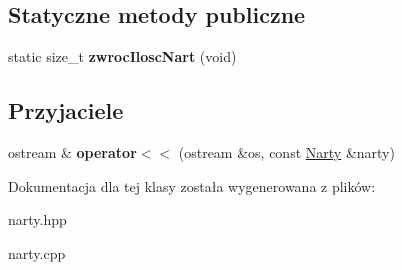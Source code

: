 \subsection*{Statyczne metody publiczne}
\begin{DoxyCompactItemize}
\item 
\mbox{\label{class_narty_a2f7178d88af8a1939ffa0c546b3ac4ee}} 
static size\+\_\+t {\bfseries zwroc\+Ilosc\+Nart} (void)
\end{DoxyCompactItemize}
\subsection*{Przyjaciele}
\begin{DoxyCompactItemize}
\item 
\mbox{\label{class_narty_af8090f0e17f1b341d4ef1e4c55391edf}} 
ostream \& {\bfseries operator$<$$<$} (ostream \&os, const \hyperlink{class_narty}{Narty} \&narty)
\end{DoxyCompactItemize}


Dokumentacja dla tej klasy została wygenerowana z plików\+:\begin{DoxyCompactItemize}
\item 
narty.\+hpp\item 
narty.\+cpp\end{DoxyCompactItemize}
